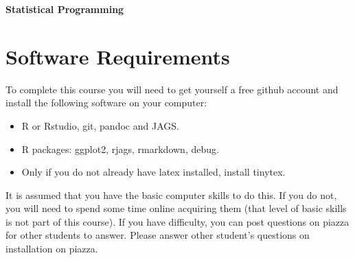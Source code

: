 \documentclass[10pt] {article}
\theoremstyle{definition}
\begin{document}
\centerline{\huge \bf Statistical Programming}

\section{Software Requirements}

To complete this course you will need to get yourself a free github account and install the following software on your computer: 
\begin{itemize}
\item R or Rstudio, git, pandoc and JAGS.
\item R packages: ggplot2, rjags, rmarkdown, debug.
\item Only if you do not already have latex installed, install tinytex. 
\end{itemize}
It is assumed that you have the basic computer skills to do this. If you do not, you will need to spend some time online acquiring them (that level of basic skills is not part of this course). If you have difficulty, you can post questions on piazza for other students to answer. Please answer other student's questions on installation on piazza. 
\end{document}
